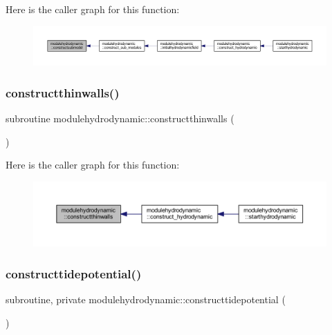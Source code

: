 Here is the caller graph for this function\+:\nopagebreak
\begin{figure}[H]
\begin{center}
\leavevmode
\includegraphics[width=350pt]{namespacemodulehydrodynamic_a2892f053e17fe9b586d237a8b6684326_icgraph}
\end{center}
\end{figure}
\mbox{\label{namespacemodulehydrodynamic_a072dc4d4b10aa4a8338fa245f13abfec}} 
\subsubsection{\texorpdfstring{constructthinwalls()}{constructthinwalls()}}
{\footnotesize\ttfamily subroutine modulehydrodynamic\+::constructthinwalls (\begin{DoxyParamCaption}{ }\end{DoxyParamCaption})\hspace{0.3cm}{\ttfamily [private]}}

Here is the caller graph for this function\+:\nopagebreak
\begin{figure}[H]
\begin{center}
\leavevmode
\includegraphics[width=350pt]{namespacemodulehydrodynamic_a072dc4d4b10aa4a8338fa245f13abfec_icgraph}
\end{center}
\end{figure}
\mbox{\label{namespacemodulehydrodynamic_a2a52e863aeb7df55203e4f6646d9b4a5}} 
\subsubsection{\texorpdfstring{constructtidepotential()}{constructtidepotential()}}
{\footnotesize\ttfamily subroutine, private modulehydrodynamic\+::constructtidepotential (\begin{DoxyParamCaption}{ }\end{DoxyParamCaption})\hspace{0.3cm}{\ttfamily [private]}}

